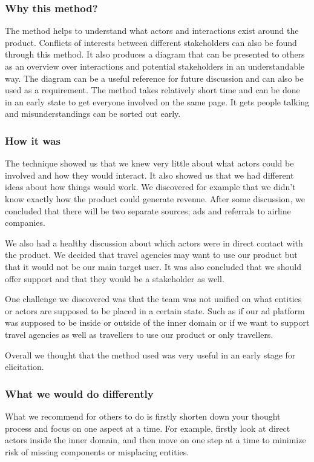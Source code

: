 \subsubsection{Why this method?}
The method helps to understand what actors and interactions exist around the product. Conflicts of interests between different stakeholders can also be found through this method. It also produces a diagram that can be presented to others as an overview over interactions and potential stakeholders in an understandable way. The diagram can be a useful reference for future discussion and can also be used as a requirement. The method takes relatively short time and can be done in an early state to get everyone involved on the same page. It gets people talking and misunderstandings can be sorted out early.
\subsubsection{How it was}
The technique showed us that we knew very little about what actors could be involved and how they would interact. It also showed us that we had different ideas about how things would work. We discovered for example that we didn’t know exactly how the product could generate revenue. After some discussion, we concluded that there will be two separate sources; ads and referrals to airline companies. 

We also had a healthy discussion about which actors were in direct contact with the product. We decided that travel agencies may want to use our product but that it would not be our main target user. It was also concluded that we should offer support and that they would be a stakeholder as well. 

One challenge we discovered was that the team was not unified on what entities or actors are supposed to be placed in a certain state. Such as if our ad platform was supposed to be inside or outside of the inner domain or if we want to support travel agencies as well as travellers to use our product or only travellers.

Overall we thought that the method used was very useful in an early stage for elicitation.
\subsubsection{What we would do differently}
What we recommend for others to do is firstly shorten down your thought process and focus on one aspect at a time. For example, firstly look at direct actors inside the inner domain, and then move on one step at a time to minimize risk of missing components or misplacing entities.



